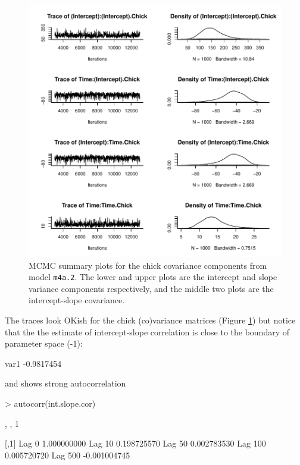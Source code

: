 \documentclass{article}
\begin{document}
\begin{figure}[!h]
\begin{center}
\includegraphics{Lecture4-017}
\end{center}
\caption{MCMC summary plots for the chick covariance components from model \texttt{m4a.2}. The lower and upper plots are the intercept and slope variance components respectively, and the middle two plots are the intercept-slope covariance.}
\label{RR2VCV-fig}
\end{figure}

The traces look OKish for the chick (co)variance matrices (Figure \ref{RR2VCV-fig}) but notice that the the estimate of intercept-slope correlation is close to the boundary of parameter space (-1):

\begin{Schunk}
\begin{Soutput}
      var1 
-0.9817454 
\end{Soutput}
\end{Schunk}

and shows strong autocorrelation

\begin{Schunk}
\begin{Sinput}
> autocorr(int.slope.cor)
\end{Sinput}
\begin{Soutput}
, , 1

                [,1]
Lag 0    1.000000000
Lag 10   0.198725570
Lag 50   0.002783530
Lag 100  0.005720720
Lag 500 -0.001004745
\end{Soutput}
\end{Schunk}
\end{document}
